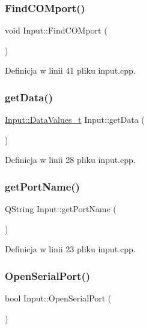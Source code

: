 \subsubsection{\texorpdfstring{Find\+C\+O\+Mport()}{FindCOMport()}}
{\footnotesize\ttfamily void Input\+::\+Find\+C\+O\+Mport (\begin{DoxyParamCaption}{ }\end{DoxyParamCaption})\hspace{0.3cm}{\ttfamily [private]}}



Definicja w linii 41 pliku input.\+cpp.

\mbox{\label{class_input_a3e7e79c0b9fc11cf350044031dbd92c9}} 
\subsubsection{\texorpdfstring{get\+Data()}{getData()}}
{\footnotesize\ttfamily \hyperlink{struct_input_1_1_data_values__t}{Input\+::\+Data\+Values\+\_\+t} Input\+::get\+Data (\begin{DoxyParamCaption}{ }\end{DoxyParamCaption})}



Definicja w linii 28 pliku input.\+cpp.

\mbox{\label{class_input_ae7ea13b2215e1ab16b7d7312d7060eca}} 
\subsubsection{\texorpdfstring{get\+Port\+Name()}{getPortName()}}
{\footnotesize\ttfamily Q\+String Input\+::get\+Port\+Name (\begin{DoxyParamCaption}{ }\end{DoxyParamCaption})}



Definicja w linii 23 pliku input.\+cpp.

\mbox{\label{class_input_a94465b0d69352fd533585256ff0bfea1}} 
\subsubsection{\texorpdfstring{Open\+Serial\+Port()}{OpenSerialPort()}}
{\footnotesize\ttfamily bool Input\+::\+Open\+Serial\+Port (\begin{DoxyParamCaption}{ }\end{DoxyParamCaption})}



